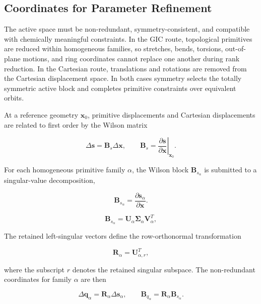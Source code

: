 \documentclass[aip,jcp,reprint,longbibliography,floatfix]{revtex4-2}
\begin{document}
\subsection{Coordinates for Parameter Refinement}

The active space must be non-redundant, symmetry-consistent, and compatible
with chemically meaningful constraints. In the GIC route, topological
primitives are reduced within homogeneous families, so stretches, bends,
torsions, out-of-plane motions, and ring coordinates cannot replace one
another during rank reduction.\cite{PulayFogarasi1992,Peng1996Redundant,Baker1996Delocalized,BakkenHelgaker2002}
In the Cartesian route, translations and rotations are removed from the
Cartesian displacement space. In both cases symmetry selects the totally
symmetric active block and completes primitive constraints over equivalent
orbits.

At a reference geometry $\mathbf{x}_0$, primitive displacements and Cartesian 
displacements are related to first order by the Wilson matrix\cite{Wilson1955}

\begin{equation}
\Delta \mathbf{s}
=
\mathbf{B}_s
\Delta \mathbf{x},
\qquad
\mathbf{B}_s =
\left.
\frac{\partial \mathbf{s}}
{\partial \mathbf{x}}
\right|_{\mathbf{x}_0}.
\end{equation}

For each homogeneous primitive family $\alpha$, the Wilson block
$\mathbf{B}_{s_\alpha}$ is submitted to a singular-value
decomposition,\cite{GolubReinsch1970}

\begin{equation}
\mathbf{B}_{s_\alpha}
=
\frac{\partial\mathbf{s}_\alpha}
{\partial\mathbf{x}} .
\end{equation}

\begin{equation}
\mathbf{B}_{s_\alpha}
=
\mathbf{U}_{\alpha}
\boldsymbol{\Sigma}_{\alpha}
\mathbf{V}_{\alpha}^{T},
\end{equation}

The retained left-singular vectors define the row-orthonormal transformation

\begin{equation}
\mathbf{R}_{\alpha}
=
\mathbf{U}_{\alpha,r}^{T},
\end{equation}

where the subscript $r$ denotes the retained singular subspace. The
non-redundant coordinates for family $\alpha$ are then

\begin{equation}
\Delta \mathbf{q}_\alpha
=
\mathbf{R}_\alpha
\Delta \mathbf{s}_\alpha ,
\qquad
\mathbf{B}_{q_\alpha}
=
\mathbf{R}_\alpha
\mathbf{B}_{s_\alpha}.
\end{equation}
\end{document}
